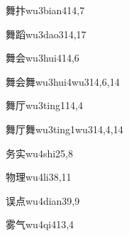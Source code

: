 \begin{entry}{舞抃}{wu3bian4}{14,7}
\end{entry}

\begin{entry}{舞蹈}{wu3dao3}{14,17}
\end{entry}

\begin{entry}{舞会}{wu3hui4}{14,6}
\end{entry}

\begin{entry}{舞会舞}{wu3hui4wu3}{14,6,14}
\end{entry}

\begin{entry}{舞厅}{wu3ting1}{14,4}
\end{entry}

\begin{entry}{舞厅舞}{wu3ting1wu3}{14,4,14}
\end{entry}

\begin{entry}{务实}{wu4shi2}{5,8}
\end{entry}

\begin{entry}{物理}{wu4li3}{8,11}
\end{entry}

\begin{entry}{误点}{wu4dian3}{9,9}
\end{entry}

\begin{entry}{雾气}{wu4qi4}{13,4}
\end{entry}


